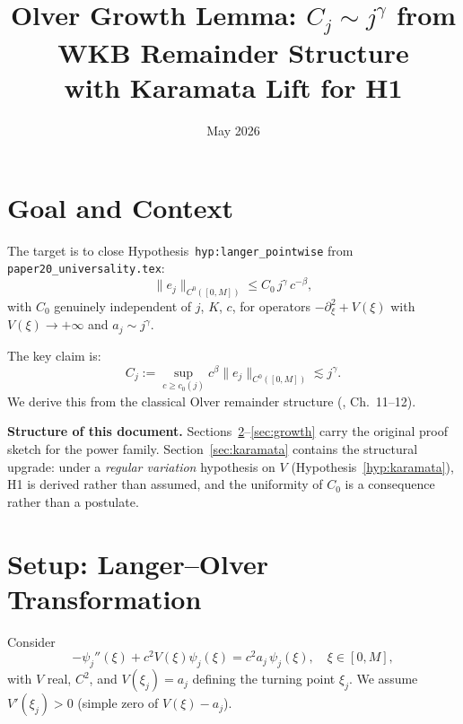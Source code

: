 \documentclass[12pt,a4paper]{amsart}
\theoremstyle{definition}
\begin{document}
\title{Olver Growth Lemma: $C_j \sim j^\gamma$ from WKB Remainder Structure\\
  \large with Karamata Lift for H1}
\date{May 2026}
\maketitle

\tableofcontents

\section{Goal and Context}

The target is to close Hypothesis~\texttt{hyp:langer\_pointwise}
from \texttt{paper20\_universality.tex}:
\[
  \|e_j\|_{C^0([0,M])} \leq C_0\,j^\gamma\,c^{-\beta},
\]
with $C_0$ genuinely independent of $j$, $K$, $c$,
for operators $-\partial^2_\xi + V(\xi)$ with
$V(\xi)\to+\infty$ and $a_j\sim j^\gamma$.

The key claim is:
\[
  C_j := \sup_{c\geq c_0(j)} c^\beta \|e_j\|_{C^0([0,M])}
  \lesssim j^\gamma.
\]
We derive this from the classical Olver remainder structure
(\cite{Olver1997}, Ch.~11--12).

\textbf{Structure of this document.}
Sections~\ref{sec:langer}--\ref{sec:growth} carry the original
proof sketch for the power family.
Section~\ref{sec:karamata} contains the structural upgrade:
under a \emph{regular variation} hypothesis on $V$
(Hypothesis~\ref{hyp:karamata}), H1 is derived rather than assumed,
and the uniformity of $C_0$ is a consequence rather than a postulate.

\section{Setup: Langer--Olver Transformation}
\label{sec:langer}

Consider
\begin{equation}\label{eq:SL}
  -\psi_j''(\xi) + c^2 V(\xi)\psi_j(\xi) = c^2 a_j\,\psi_j(\xi),
  \quad \xi\in[0,M],
\end{equation}
with $V$ real, $C^2$, and $V(\xi_j) = a_j$ defining the
turning point $\xi_j$. We assume $V'(\xi_j) > 0$ (simple zero of
$V(\xi)-a_j$).
\end{document}
